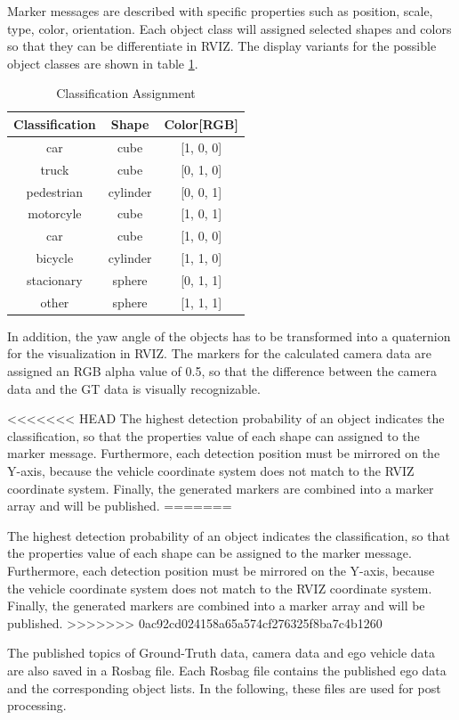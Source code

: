 Marker messages are described with specific properties such as position, scale, type, color, orientation. Each object class will assigned selected shapes and colors so that they can be differentiate in RVIZ. The display variants for the possible object classes are shown in table \ref{ClassificationAssignment}. 

\begin{table}[h]
	\caption{Classification Assignment}
	\label{ClassificationAssignment}
	\begin{center}
		\begin{tabular}{c c c}
			\hline
			Classification & Shape & Color[RGB]\\
			\hline
			car & cube & [1, 0, 0]\\
			truck & cube & [0, 1, 0]\\
			pedestrian & cylinder & [0, 0, 1]\\
			motorcyle & cube & [1, 0, 1]\\
			car & cube & [1, 0, 0]\\
			bicycle & cylinder & [1, 1, 0]\\
			stacionary & sphere & [0, 1, 1]\\
			other & sphere & [1, 1, 1]\\
			\hline
			
			
		\end{tabular}
	\end{center}
\end{table}

In addition, the yaw angle of the objects has to be transformed into a quaternion for the visualization in RVIZ. The markers for the calculated camera data are assigned an RGB alpha value of 0.5, so that the difference between the camera data and the GT data is visually recognizable. 

<<<<<<< HEAD
The highest detection probability of an object indicates the classification, so that the properties value of each shape can assigned to the marker message. Furthermore, each detection position must be mirrored on the Y-axis, because the vehicle coordinate system does not match to the RVIZ coordinate system. Finally, the generated markers are combined into a marker array and will be published.
=======



The highest detection probability of an object indicates the classification, so that the properties value of each shape can be assigned to the marker message. Furthermore, each detection position must be mirrored on the Y-axis, because the vehicle coordinate system does not match to the RVIZ coordinate system. Finally, the generated markers are combined into a marker array and will be published.
>>>>>>> 0ac92cd024158a65a574cf276325f8ba7c4b1260

The published topics of Ground-Truth data, camera data and ego vehicle data are also saved in a Rosbag file. Each Rosbag file contains the published ego data and the corresponding object lists. In the following, these files are used for post processing.